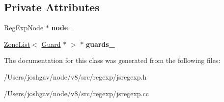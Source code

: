 \subsection*{Private Attributes}
\begin{DoxyCompactItemize}
\item 
\hyperlink{classv8_1_1internal_1_1_reg_exp_node}{Reg\+Exp\+Node} $\ast$ {\bfseries node\+\_\+}\hypertarget{classv8_1_1internal_1_1_guarded_alternative_aceac0fa84cdc59b9672f616a11c38236}{}\label{classv8_1_1internal_1_1_guarded_alternative_aceac0fa84cdc59b9672f616a11c38236}

\item 
\hyperlink{classv8_1_1internal_1_1_zone_list}{Zone\+List}$<$ \hyperlink{classv8_1_1internal_1_1_guard}{Guard} $\ast$ $>$ $\ast$ {\bfseries guards\+\_\+}\hypertarget{classv8_1_1internal_1_1_guarded_alternative_a9c2df67316057838d6aab295e42bb69e}{}\label{classv8_1_1internal_1_1_guarded_alternative_a9c2df67316057838d6aab295e42bb69e}

\end{DoxyCompactItemize}


The documentation for this class was generated from the following files\+:\begin{DoxyCompactItemize}
\item 
/\+Users/joshgav/node/v8/src/regexp/jsregexp.\+h\item 
/\+Users/joshgav/node/v8/src/regexp/jsregexp.\+cc\end{DoxyCompactItemize}
